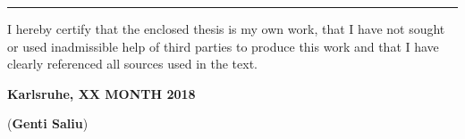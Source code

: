\vspace*{\fill}

\rule{1.0\textwidth}{0.6pt}

\vspace*{0.75em}

I hereby certify that the enclosed thesis is my own work, that I have not sought or used inadmissible help of third parties to produce this work and that I have clearly referenced all sources used in the text.

\vspace*{0.75em}

\textbf{Karlsruhe, XX MONTH 2018}

\vspace*{4em}

\dotfill \hspace*{8cm} 

\hspace*{1.79cm}(\textbf{Genti Saliu})
